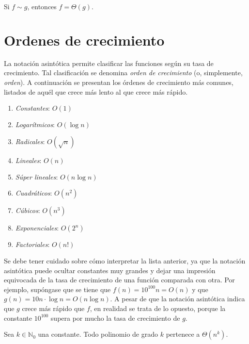 \begin{prop}
    Si $f\sim g$, entonces $f=\Theta(g)$.
\end{prop}

\section{Ordenes de crecimiento}

La notación asintótica permite clasificar las funciones según su tasa
de crecimiento. Tal clasificación se denomina \emph{orden de crecimiento}
(o, simplemente, \emph{orden}). A continuación se presentan los órdenes
de crecimiento más comunes, listados de aquél que crece más lento
al que crece más rápido.

\begin{enumerate}
    \item \emph{Constantes}: $O(1)$
    \item \emph{Logarítmicos}: $O(\log n)$
    \item \emph{Radicales}: $O(\sqrt{n})$
    \item \emph{Lineales}: $O(n)$
    \item \emph{Súper lineales}: $O(n\log n)$
    \item \emph{Cuadráticos}: $O(n^{2})$
    \item \emph{Cúbicos}: $O(n^{3})$
    \item \emph{Exponenciales}: $O(2^{n})$
    \item \emph{Factoriales}: $O(n!)$
\end{enumerate}

Se debe tener cuidado sobre cómo interpretar la lista anterior, ya
que la notación asintótica puede ocultar constantes muy grandes y 
dejar una impresión equivocada de la tasa de crecimiento
de una función comparada con otra. 
Por ejemplo, supóngase que se tiene que $f(n)=10^{100}n=O(n)$
y que $g(n)=10n\cdot\log n=O(n\log n)$. A pesar de que la notación
asintótica indica que $g$ crece más rápido que $f$, en realidad
se trata de lo opuesto, porque la constante $10^{100}$ supera por mucho 
la tasa de crecimiento de $g$.

\begin{thm}
    Sea $k\in\mathbb{N}_{0}$ una constante. Todo polinomio de grado $k$
    pertenece a $\Theta(n^{k})$.
\end{thm}

